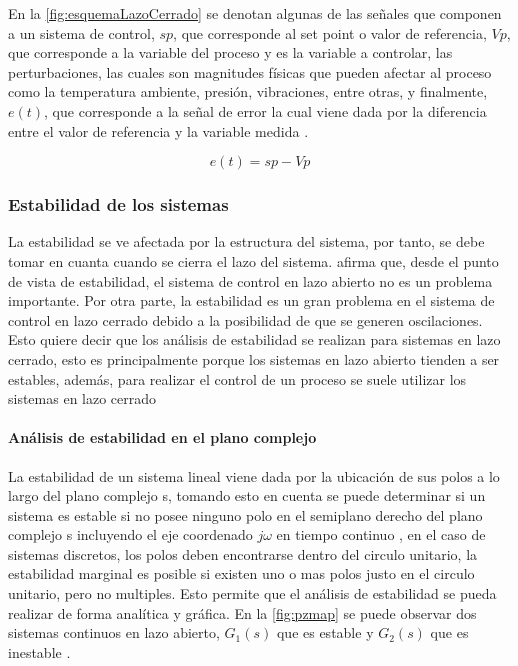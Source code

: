             En la \cref{fig:esquemaLazoCerrado} se denotan algunas de las señales que componen a un sistema de control, $sp$, que corresponde al set point o valor de referencia, $Vp$, que corresponde a la variable del proceso y es la variable a controlar, las perturbaciones, las cuales son magnitudes físicas que pueden afectar al proceso como la temperatura ambiente, presión, vibraciones, entre otras, y finalmente, $e(t)$, que corresponde a la señal de error la cual viene dada por la diferencia entre el valor de referencia y la variable medida \Parencite{maloney2006electronica}.
            
            \begin{equation}\label{eq:Serror}
				e(t) = sp - Vp
            \end{equation}
            
        \subsubsection{Estabilidad de los sistemas}

            La estabilidad se ve afectada por la estructura del sistema, por tanto, se debe tomar en cuanta cuando se cierra el lazo del sistema. \textcite{ogata2003ingenieria} afirma que, desde el punto de vista de estabilidad, el sistema de control en lazo abierto no es un problema importante. Por otra parte, la estabilidad es un gran problema en el sistema de control en lazo cerrado debido a la posibilidad de que se generen oscilaciones. Esto quiere decir que los análisis de estabilidad se realizan para sistemas en lazo cerrado, esto es principalmente porque los sistemas en lazo abierto tienden a ser estables, además, para realizar el control de un proceso se suele utilizar los sistemas en lazo cerrado

            \paragraph{Análisis de estabilidad en el plano complejo}
            
                La estabilidad de un sistema lineal viene dada por la ubicación de sus polos a lo largo del plano complejo s, tomando esto en cuenta se puede determinar si un sistema es estable si no posee ninguno polo en el semiplano derecho del plano complejo s incluyendo el eje coordenado $j\omega$ en tiempo continuo \Parencite{ogata2003ingenieria}, en el caso de sistemas discretos, los polos deben encontrarse dentro del circulo unitario, la estabilidad marginal es posible si existen uno o mas polos justo en el circulo unitario, pero no multiples. Esto permite que el análisis de estabilidad se pueda realizar de forma analítica y gráfica. En la \cref{fig:pzmap} se puede observar dos sistemas continuos en lazo abierto, $G_1(s)$ que es estable y $G_2(s)$ que es inestable .

